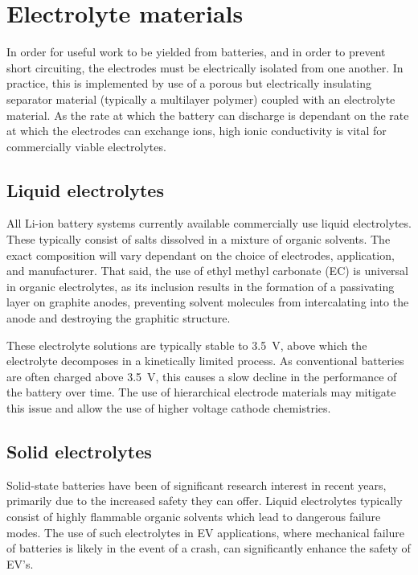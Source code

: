 \newpage
\section{Electrolyte materials}
In order for useful work to be yielded from batteries, and in order to prevent short circuiting, the electrodes must be electrically isolated from one another.
In practice, this is implemented by use of a porous but electrically insulating separator material (typically a multilayer polymer) coupled with an electrolyte material.
As the rate at which the battery can discharge is dependant on the rate at which the electrodes can exchange  ions, high ionic conductivity is vital for commercially viable electrolytes.


\subsection{Liquid electrolytes}
All Li-ion battery systems currently available commercially use liquid electrolytes.\cite{Famprikis2019}
These typically consist of  salts dissolved in a mixture of organic solvents.
The exact composition will vary dependant on the choice of electrodes, application, and manufacturer.
That said, the use of ethyl methyl carbonate (EC) is universal in organic electrolytes, as its inclusion results in the formation of a passivating layer on graphite anodes, preventing solvent molecules from intercalating into the anode and destroying the graphitic structure.\cite{Palacin2009}

These electrolyte solutions are typically stable to \SI{3.5}{\volt}, above which the electrolyte decomposes in a kinetically limited process.
As conventional batteries are often charged above \SI{3.5}{\volt}, this causes a slow decline in the performance of the battery over time.
The use of hierarchical electrode materials may mitigate this issue and allow the use of higher voltage cathode chemistries. \cite{Zhou2018}

\subsection{Solid electrolytes}
Solid-state batteries have been of significant research interest in recent years, primarily due to the increased safety they can offer.\cite{Famprikis2019, Zhang2018, Manthiram2017a, Janek2016}
Liquid electrolytes typically consist of highly flammable organic solvents which lead to dangerous failure modes.
The use of such electrolytes in EV applications, where mechanical failure of batteries is likely in the event of a crash, can significantly enhance the safety of EV's.

